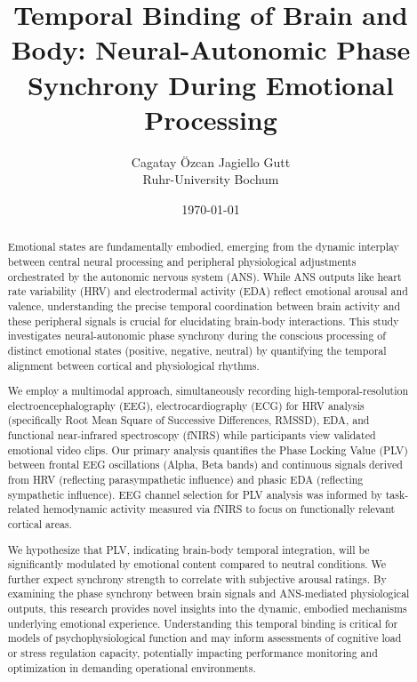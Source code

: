 \documentclass[12pt, a4paper]{article} %
\title{Temporal Binding of Brain and Body: Neural-Autonomic Phase Synchrony During Emotional Processing}
\author{Cagatay Özcan Jagiello Gutt \\ %
        \normalsize Ruhr-University Bochum} %
\date{\today} %
\begin{document}
{\bfseries\maketitle} %
\thispagestyle{fancy} %
\vspace{-2\baselineskip} %

\begin{abstract}
Emotional states are fundamentally embodied, emerging from the dynamic interplay between central neural processing and peripheral physiological adjustments orchestrated by the autonomic nervous system (ANS). While ANS outputs like heart rate variability (HRV) and electrodermal activity (EDA) reflect emotional arousal and valence, understanding the precise temporal coordination between brain activity and these peripheral signals is crucial for elucidating brain-body interactions. This study investigates neural-autonomic phase synchrony during the conscious processing of distinct emotional states (positive, negative, neutral) by quantifying the temporal alignment between cortical and physiological rhythms.
    
We employ a multimodal approach, simultaneously recording high-temporal-resolution electroencephalography (EEG), electrocardiography (ECG) for HRV analysis (specifically Root Mean Square of Successive Differences, RMSSD), EDA, and functional near-infrared spectroscopy (fNIRS) while participants view validated emotional video clips. Our primary analysis quantifies the Phase Locking Value (PLV) between frontal EEG oscillations (Alpha, Beta bands) and continuous signals derived from HRV (reflecting parasympathetic influence) and phasic EDA (reflecting sympathetic influence). EEG channel selection for PLV analysis was informed by task-related hemodynamic activity measured via fNIRS to focus on functionally relevant cortical areas.
    
We hypothesize that PLV, indicating brain-body temporal integration, will be significantly modulated by emotional content compared to neutral conditions. We further expect synchrony strength to correlate with subjective arousal ratings. By examining the phase synchrony between brain signals and ANS-mediated physiological outputs, this research provides novel insights into the dynamic, embodied mechanisms underlying emotional experience. Understanding this temporal binding is critical for models of psychophysiological function and may inform assessments of cognitive load or stress regulation capacity, potentially impacting performance monitoring and optimization in demanding operational environments.
\end{abstract}
    
\end{document}

